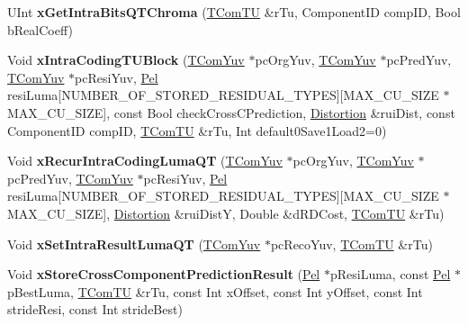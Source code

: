 \begin{DoxyCompactItemize}
U\+Int {\bfseries x\+Get\+Intra\+Bits\+Q\+T\+Chroma} (\hyperlink{class_t_com_t_u}{T\+Com\+TU} \&r\+Tu, Component\+ID comp\+ID, Bool b\+Real\+Coeff)
\item 
\mbox{\label{class_t_enc_search_aad0dded10b80e54c486c87b5d0a8a388}} 
Void {\bfseries x\+Intra\+Coding\+T\+U\+Block} (\hyperlink{class_t_com_yuv}{T\+Com\+Yuv} $\ast$pc\+Org\+Yuv, \hyperlink{class_t_com_yuv}{T\+Com\+Yuv} $\ast$pc\+Pred\+Yuv, \hyperlink{class_t_com_yuv}{T\+Com\+Yuv} $\ast$pc\+Resi\+Yuv, \hyperlink{_type_def_8h_af92141699657699b4b547be0c8517541}{Pel} resi\+Luma\mbox{[}N\+U\+M\+B\+E\+R\+\_\+\+O\+F\+\_\+\+S\+T\+O\+R\+E\+D\+\_\+\+R\+E\+S\+I\+D\+U\+A\+L\+\_\+\+T\+Y\+P\+ES\mbox{]}\mbox{[}M\+A\+X\+\_\+\+C\+U\+\_\+\+S\+I\+ZE $\ast$M\+A\+X\+\_\+\+C\+U\+\_\+\+S\+I\+ZE\mbox{]}, const Bool check\+Cross\+C\+Prediction, \hyperlink{_type_def_8h_aed82b23ef6849d0bc3d95c92102d5b50}{Distortion} \&rui\+Dist, const Component\+ID comp\+ID, \hyperlink{class_t_com_t_u}{T\+Com\+TU} \&r\+Tu, Int default0\+Save1\+Load2=0)
\item 
\mbox{\label{class_t_enc_search_adacaaa315da446a44ff423acf64d873f}} 
Void {\bfseries x\+Recur\+Intra\+Coding\+Luma\+QT} (\hyperlink{class_t_com_yuv}{T\+Com\+Yuv} $\ast$pc\+Org\+Yuv, \hyperlink{class_t_com_yuv}{T\+Com\+Yuv} $\ast$pc\+Pred\+Yuv, \hyperlink{class_t_com_yuv}{T\+Com\+Yuv} $\ast$pc\+Resi\+Yuv, \hyperlink{_type_def_8h_af92141699657699b4b547be0c8517541}{Pel} resi\+Luma\mbox{[}N\+U\+M\+B\+E\+R\+\_\+\+O\+F\+\_\+\+S\+T\+O\+R\+E\+D\+\_\+\+R\+E\+S\+I\+D\+U\+A\+L\+\_\+\+T\+Y\+P\+ES\mbox{]}\mbox{[}M\+A\+X\+\_\+\+C\+U\+\_\+\+S\+I\+ZE $\ast$M\+A\+X\+\_\+\+C\+U\+\_\+\+S\+I\+ZE\mbox{]}, \hyperlink{_type_def_8h_aed82b23ef6849d0bc3d95c92102d5b50}{Distortion} \&rui\+DistY, Double \&d\+R\+D\+Cost, \hyperlink{class_t_com_t_u}{T\+Com\+TU} \&r\+Tu)
\item 
\mbox{\label{class_t_enc_search_ad3ca31a5b31996c3fb4287248e2cdebe}} 
Void {\bfseries x\+Set\+Intra\+Result\+Luma\+QT} (\hyperlink{class_t_com_yuv}{T\+Com\+Yuv} $\ast$pc\+Reco\+Yuv, \hyperlink{class_t_com_t_u}{T\+Com\+TU} \&r\+Tu)
\item 
\mbox{\label{class_t_enc_search_abe22698a1638141c5c093d28032f5cd3}} 
Void {\bfseries x\+Store\+Cross\+Component\+Prediction\+Result} (\hyperlink{_type_def_8h_af92141699657699b4b547be0c8517541}{Pel} $\ast$p\+Resi\+Luma, const \hyperlink{_type_def_8h_af92141699657699b4b547be0c8517541}{Pel} $\ast$p\+Best\+Luma, \hyperlink{class_t_com_t_u}{T\+Com\+TU} \&r\+Tu, const Int x\+Offset, const Int y\+Offset, const Int stride\+Resi, const Int stride\+Best)

\end{DoxyCompactItemize}
